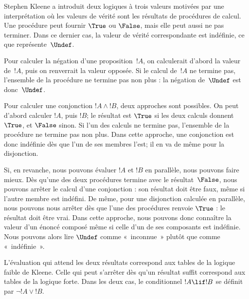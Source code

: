 \documentclass[../../../include/open-logic-section]{subfiles}
\begin{document}


Stephen Kleene a introduit deux
logiques à trois valeurs motivées
par une interprétation où les valeurs
de vérité sont les résultats de
procédures de calcul. Une procédure
peut fournir $\True$ ou $\False$,
mais elle peut aussi ne pas terminer.
Dans ce dernier cas, la valeur de
vérité correspondante est indéfinie,
ce que représente~$\Undef$.

Pour calculer la négation d'une
proposition~$!A$, on calculerait
d'abord la valeur de~$!A$, puis on
renverrait la valeur opposée. Si le
calcul de~$!A$ ne termine pas,
l'ensemble de la procédure ne termine
pas non plus : la négation de~$\Undef$
est donc~$\Undef$.

Pour calculer une conjonction
$!A\land !B$, deux approches sont
possibles. On peut d'abord calculer
$!A$, puis $!B$; le résultat est
$\True$ si les deux calculs donnent
$\True$, et $\False$ sinon. Si
l'un des calculs ne termine pas,
l'ensemble de la procédure ne termine
pas non plus. Dans cette approche,
une conjonction est donc indéfinie
dès que l'un de ses membres l'est;
il en va de même pour la disjonction.

Si, en revanche, nous pouvons évaluer
$!A$ et $!B$ en parallèle, nous
pouvons faire mieux. Dès qu'une des
deux procédures termine avec le
résultat~$\False$, nous pouvons
arrêter le calcul d'une conjonction :
son résultat doit être faux, même si
l'autre membre est indéfini. De même,
pour une disjonction calculée en
parallèle, nous pouvons nous arrêter
dès que l'une des procédures renvoie
$\True$ : le résultat doit être vrai.
Dans cette approche, nous pouvons
donc connaître la valeur d'un énoncé
composé même si celle d'un de ses
composants est indéfinie. Nous pouvons
alors lire $\Undef$ comme «~inconnue~»
plutôt que comme «~indéfinie~».

L'évaluation qui attend les deux résultats correspond aux tables
de la logique faible de Kleene. Celle qui peut s'arrêter dès
qu'un résultat suffit correspond aux tables de la logique forte.
Dans les deux cas, le conditionnel $!A\lif !B$ se définit par
$\lnot !A\lor !B$.
\end{document}
